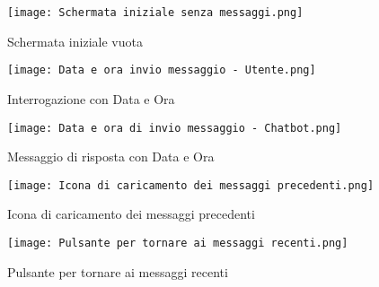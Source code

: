 \begin{figure}[h]
    \centering
        \texttt{[image: Schermata iniziale senza messaggi.png]}
        \caption{Schermata iniziale vuota}
        \label{fig:Discussione vuota}        
\end{figure}
\begin{figure}[h]
    \centering
    \begin{minipage}[t]{.45\textwidth}
        \centering
        \texttt{[image: Data e ora invio messaggio - Utente.png]}
        \caption{\centering Interrogazione con Data e Ora}
        \label{fig:Data e ora di invio domanda}
    \end{minipage}%
    \hfill
    \begin{minipage}[t]{.45\textwidth}
        \centering
        \texttt{[image: Data e ora di invio messaggio - Chatbot.png]}
        \caption{\centering Messaggio di risposta con Data e Ora}
        \label{fig:Data e ora di invio risposta}
    \end{minipage}
\end{figure}
\begin{figure}[h]
    \centering
        \texttt{[image: Icona di caricamento dei messaggi precedenti.png]}
        \caption{Icona di caricamento dei messaggi precedenti}
        \label{fig:Icona di caricamento dei messaggi precedenti}
\end{figure}
\begin{figure}[h]
    \centering
        \texttt{[image: Pulsante per tornare ai messaggi recenti.png]}
        \caption{Pulsante per tornare ai messaggi recenti}
        \label{fig:Pulsante per tornare ai messaggi recenti}
\end{figure}

\newpage


